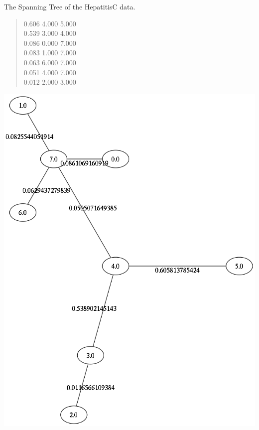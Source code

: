 \documentclass[a4paper]{article}
\begin{document}
The Spanning Tree of the HepatitisC data.
%
\begin{quote}

0.606  4.000  5.000 \\
0.539  3.000  4.000 \\
0.086  0.000  7.000 \\
0.083  1.000  7.000 \\
0.063  6.000  7.000 \\
0.051  4.000  7.000 \\
0.012  2.000  3.000 \\

\end{quote}

\includegraphics[scale=0.500000]{span.png}
\end{document}
